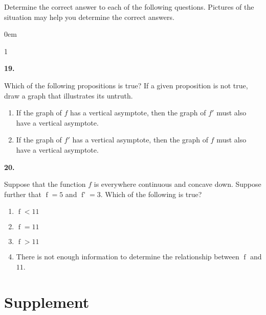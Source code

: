 \documentclass[12pt,]{book}
\newcommand{\lt}{<}
\newcommand{\gt}{>}
\theoremstyle{plain}
\theoremstyle{definition}
\newenvironment{exercisegroup}%
{\medskip\noindent}%
{\par\bigskip}%
\newlength{\exercisegroupindent}%
\newlength{\exercisegroupitemwidth}%
\newenvironment{exercisegrouplist}%
{\vspace{-\partopsep}%
\begin{adjustwidth}{\exercisegroupindent}{0em}}%
{\end{adjustwidth}%
\vspace{-\partopsep}%
\vspace{\baselineskip}}%
\newenvironment{exercisegroupbycol}[1]%
{\begin{exercisegrouplist}%
\vspace{-\multicolsep}%
\begin{multicols}{#1}%
\setlength{\parindent}{0em}%
\setlength{\exercisegroupitemwidth}{\linewidth}}%
{\end{multicols}%
\vspace{-\multicolsep}%
\end{exercisegrouplist}}%
\newenvironment{exercisegroupitem}[1]%
{\begin{minipage}[t]{\exercisegroupitemwidth}
\vspace{0pt}%
{\bfseries#1}%
\rule{0pt}{\baselineskip}}{\strut%
\end{minipage}%
\hspace{\columnsep}}%
\providecommand\phantomsection{}
\newcommand{\fe}[2]{\mathop{{#1}{\left(#2\right)}}}
\newcommand{\fd}[1]{#1'}
\begin{document}
\begin{exercisegroup}%
Determine the correct answer to each of the following questions.  Pictures of the situation may help you determine the correct answers.%
\par
\begin{exercisegroupbycol}{1}%
\begin{exercisegroupitem}{19. }\phantomsection\hypertarget{exercise-19}{\null}
Which of the following propositions is true? If a given proposition is not true, draw a graph that illustrates its untruth.%
\begin{enumerate}[label=(\alph*)]
\item{}If the graph of \(f\) has a vertical asymptote, then the graph of \(\fd{f}\) must also have a vertical asymptote.\item{}If the graph of \(\fd{f}\) has a vertical asymptote, then the graph of \(f\) must also have a vertical asymptote.\end{enumerate}
\end{exercisegroupitem}%
\par%
\begin{exercisegroupitem}{20. }\phantomsection\hypertarget{exercise-20}{\null}
Suppose that the function \(f\) is everywhere continuous and concave down.  Suppose further that \(\fe{f}{7}=5\) and \(\fe{\fd{f}}{7}=3\).  Which of the following is true?%
\begin{enumerate}[label=(\alph*)]
\item{}\(\fe{f}{9}\lt11\)\item{}\(\fe{f}{9}=11\)\item{}\(\fe{f}{9}\gt11\)\item{}There is not enough information to determine the relationship between \(\fe{f}{9}\) and \(11\).\end{enumerate}
\end{exercisegroupitem}%
\par%
\end{exercisegroupbycol}%
\end{exercisegroup}%
\typeout{************************************************}
\typeout{************************************************}
\section[Supplement]{Supplement}\label{functions-derivatives-antiderivatives-supplementary-exercises}
\typeout{************************************************}
\typeout{************************************************}
\end{document}
